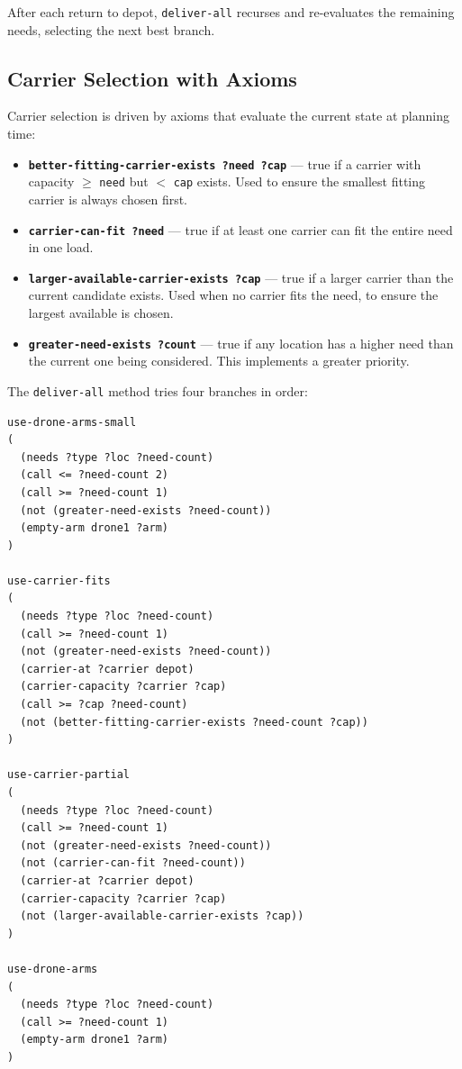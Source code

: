 \documentclass{article}
\begin{document}
After each return to depot, \texttt{deliver-all} recurses and re-evaluates the remaining needs, selecting the next best branch.

\subsection{Carrier Selection with Axioms}

Carrier selection is driven by axioms that evaluate the current state at planning time:

\begin{itemize}
    \item \textbf{\texttt{better-fitting-carrier-exists ?need ?cap}} --- true if a carrier with capacity $\geq$ \texttt{need} but $<$ \texttt{cap} exists. Used to ensure the smallest fitting carrier is always chosen first.
    \item \textbf{\texttt{carrier-can-fit ?need}} --- true if at least one carrier can fit the entire need in one load.
    \item \textbf{\texttt{larger-available-carrier-exists ?cap}} --- true if a larger carrier than the current candidate exists. Used when no carrier fits the need, to ensure the largest available is chosen.
    \item \textbf{\texttt{greater-need-exists ?count}} --- true if any location has a higher need than the current one being considered. This implements a greater priority.
\end{itemize}

The \texttt{deliver-all} method tries four branches in order:

\begin{lstlisting}[caption={Delivery branches in deliver-all (p3\_3)}]
use-drone-arms-small
(
  (needs ?type ?loc ?need-count)
  (call <= ?need-count 2)
  (call >= ?need-count 1)
  (not (greater-need-exists ?need-count))
  (empty-arm drone1 ?arm)
)

use-carrier-fits
(
  (needs ?type ?loc ?need-count) 
  (call >= ?need-count 1)
  (not (greater-need-exists ?need-count))
  (carrier-at ?carrier depot)
  (carrier-capacity ?carrier ?cap)
  (call >= ?cap ?need-count)
  (not (better-fitting-carrier-exists ?need-count ?cap))
)

use-carrier-partial
(
  (needs ?type ?loc ?need-count) 
  (call >= ?need-count 1)
  (not (greater-need-exists ?need-count))
  (not (carrier-can-fit ?need-count))
  (carrier-at ?carrier depot)
  (carrier-capacity ?carrier ?cap)
  (not (larger-available-carrier-exists ?cap))
)

use-drone-arms
(
  (needs ?type ?loc ?need-count)
  (call >= ?need-count 1)
  (empty-arm drone1 ?arm)
)
\end{lstlisting}
\end{document}
